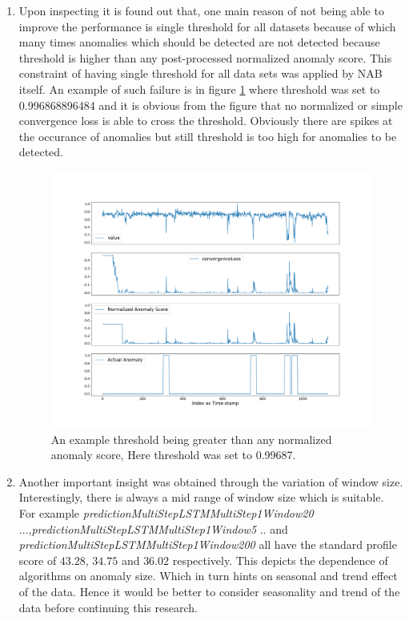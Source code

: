 \documentclass[12pt]{article}
\begin{document}
\begin{enumerate}
\item Upon inspecting it is found out that, one main reason of not being able to improve the performance is single threshold for all datasets because of which many times anomalies which should be detected are not detected because threshold is higher than any post-processed normalized anomaly score. This constraint of having single threshold for all data sets was applied by NAB itself. An example of such failure is in figure \ref{thresholdFailure} where threshold was set to 0.996868896484 and it is obvious from the figure that no normalized or simple convergence loss is able to cross the threshold. Obviously there are spikes at the occurance of anomalies but still threshold is too high for anomalies to be detected.
\begin{figure}[H]
\center
        \includegraphics[width=\textwidth]{images/results/predictionMultiStepNNMultiStep4Window50mseconvergenceLoss1271913.png}
    \caption{An example threshold being greater than any normalized anomaly score, Here threshold was set to 0.99687.}
    \label{thresholdFailure}
\end{figure}
\item Another important insight was obtained through the variation of window size. Interestingly, there is always a mid range of window size which is suitable. For example \textit{predictionMultiStepLSTMMultiStep1Window20} ...,\textit{predictionMultiStepLSTMMultiStep1Window5} .. and \textit{predictionMultiStepLSTMMultiStep1Window200} all have the standard profile score of $43.28$, $34.75$ and $36.02$ respectively. This depicts the dependence of algorithms on anomaly size. Which in turn hints on seasonal and trend effect of the data. Hence it would be better to consider seasonality and trend of the data before continuing this research.

\end{enumerate}
\end{document}

